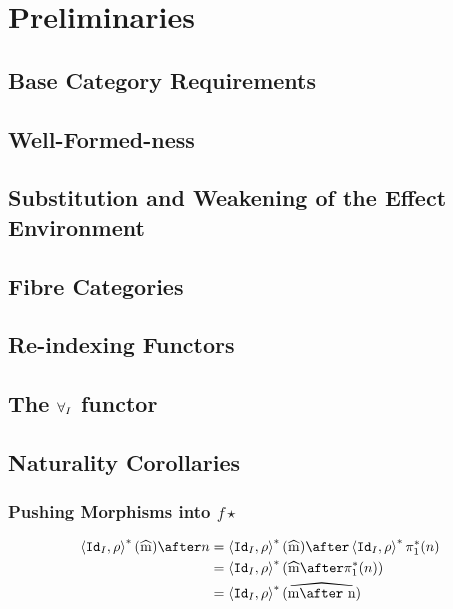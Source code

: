 \documentclass{report}
\begin{document}
\tableofcontents
\chapter{Preliminaries}

\section{Base Category Requirements}
\croleBaseCategory

\section{Well-Formed-ness}
\croleWellFormedNess

\section{Substitution and Weakening of the Effect Environment}
\effectSubsAndWeakening

\section{Fibre Categories}
\croleFibres

\section{Re-indexing Functors}
\reindexingFunctors

\section{The $\forall_I$ functor}
\allICrole

\section{Naturality Corollaries}
\naturalityLemmas

\subsection{Pushing Morphisms into $f\star$}

\begin{align}
    \pr{\Id{I}}{\rho}\star(\widehat{m})\after n &= \pr{\Id{I}}{\rho}\star(\widehat{m})\after\pr{\Id{I}}{\rho}\star\p\star(n)\\
    & = \pr{\Id{I}}{\rho}\star(\widehat{m}\after\pstar(n))\\
    &= \pr{\Id{I}}{\rho}\star(\widehat{m\after n})
\end{align}
\end{document}
